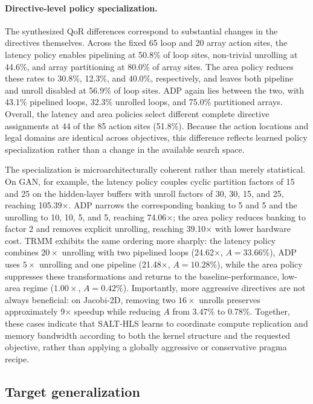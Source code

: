 \paragraph{Directive-level policy specialization.}
The synthesized QoR differences correspond to substantial changes in
the directives themselves. Across the fixed 65 loop and 20 array
action sites, the latency policy enables pipelining at 50.8\% of loop
sites, non-trivial unrolling at 44.6\%, and array partitioning at
80.0\% of array sites. The area policy reduces these rates to
30.8\%, 12.3\%, and 40.0\%, respectively, and leaves both
pipeline and unroll disabled at 56.9\% of loop sites. ADP again lies
between the two, with 43.1\% pipelined loops, 32.3\% unrolled loops,
and 75.0\% partitioned arrays. Overall, the latency and area policies
select different complete directive assignments at 44 of the 85
action sites (51.8\%). Because the action locations and legal domains
are identical across objectives, this difference reflects learned
policy specialization rather than a change in the available search
space.

The specialization is microarchitecturally coherent rather than merely
statistical. On GAN, for example, the latency policy couples cyclic
partition factors of 15 and 25 on the hidden-layer buffers with
unroll factors of 30, 30, 15, and 25, reaching 105.39$\times$.
ADP narrows the corresponding banking to 5 and 5 and the unrolling
to 10, 10, 5, and 5, reaching 74.06$\times$; the area policy
reduces banking to factor 2 and removes explicit unrolling, reaching
39.10$\times$ with lower hardware cost. TRMM exhibits the same
ordering more sharply: the latency policy combines $20\times$
unrolling with two pipelined loops (24.62$\times$, $A=33.66\%$),
ADP uses $5\times$ unrolling and one pipeline
(21.48$\times$, $A=10.28\%$), while the area policy suppresses
these transformations and returns to the baseline-performance,
low-area regime ($1.00\times$, $A=0.42\%$). Importantly, more
aggressive directives are not always beneficial: on Jacobi-2D,
removing two $16\times$ unrolls preserves approximately
9$\times$ speedup while reducing $A$ from 3.47\% to 0.78\%.
Together, these cases indicate that SALT-HLS learns to coordinate
compute replication and memory bandwidth according to both the kernel structure and the requested objective, rather than applying a globally aggressive or conservative pragma recipe.





\subsection{Target generalization}
\label{subsec:target-generalization}

